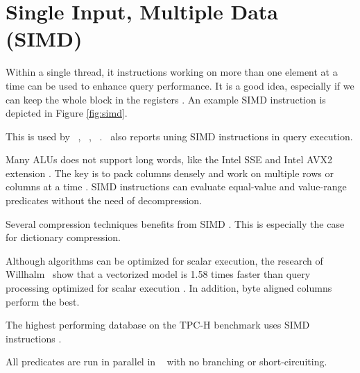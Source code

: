 \section{Single Input, Multiple Data (SIMD)}
\label{sec:Single Input, Multiple Instructions (SIMD)}
Within a single thread, it instructions working on more than one element at a time can be used to enhance query performance. It is a good idea, especially if we can keep the whole block in the registers \cite{Neumann2011-uq}. An example SIMD instruction is depicted in Figure \ref{fig:simd}.


This is used by \oracle~\cite{Lahiri2015-mz}, \blink~\cite{Barber2012-xt}, \ibm~\cite{Raman2013-em}. \exasol~also reports uning SIMD instructions in query execution.

Many ALUs does not support long words, like the Intel SSE and Intel AVX2 extension \cite{Willhalm2009-hu, Willhalm2013-rl}. The key is to pack columns densely and work on multiple rows or columns at a time \cite{Johnson2008-cp}. SIMD instructions can evaluate equal-value and value-range predicates without the need of decompression.

Several compression techniques benefits from SIMD \cite{Lemke2010-is}. This is especially the case for dictionary compression.

Although algorithms can be optimized for scalar execution, the research of Willhalm \ea~show that a vectorized model is 1.58 times faster than query processing optimized for scalar execution \cite{Willhalm2009-hu}. In addition, byte aligned columns perform the best.

The highest performing database on the TPC-H benchmark uses SIMD instructions \cite{Exasol2014-xh}.

All predicates are run in parallel in \blink~\cite{Raman2008-gi} with no branching or short-circuiting.

